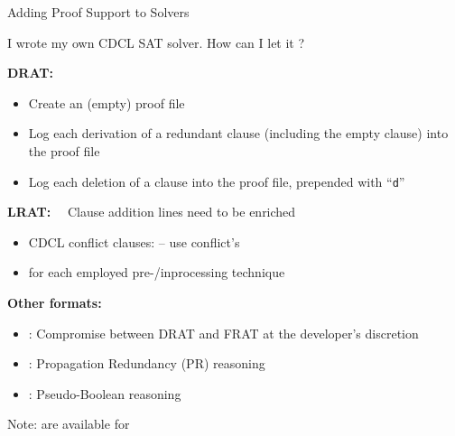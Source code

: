 \documentclass[t,english]{sdqbeamer}
\begin{document}
\begin{frame}{Adding Proof Support to Solvers}
	
	\vspace*{-2mm}
	I wrote my own CDCL SAT solver. How can I let it ?
	
	\vspace*{2mm}
	\textbf{DRAT:} \ \ \pause{}
	\begin{itemize}
		\item Create an (empty) proof file
		\item Log each derivation of a redundant clause {\small (including the empty clause)} into the proof file
		\item Log each deletion of a clause into the proof file, prepended with ``\texttt{d}''
	\end{itemize}
	
	\vspace*{2mm}
	\textbf{LRAT:} \ \ \pause{}Clause addition lines need to be enriched 
	\begin{itemize}
		\item CDCL conflict clauses:  -- use conflict's 
		\item {} for each employed pre-/inprocessing technique
	\end{itemize}
	
	\pause
	\vspace*{2mm}
	\textbf{Other formats:}
	\begin{itemize}
		\item {}: Compromise between DRAT and FRAT at the developer's discretion \cite{baek2022flexible}
		\item {}: Propagation Redundancy (PR) reasoning \cite{balyo2023proceedings}
		\item {}: Pseudo-Boolean reasoning \cite{balyo2023proceedings}
	\end{itemize}
	
	\vspace*{2mm}
	{Note:}  are available for  
\end{frame}
\end{document}
